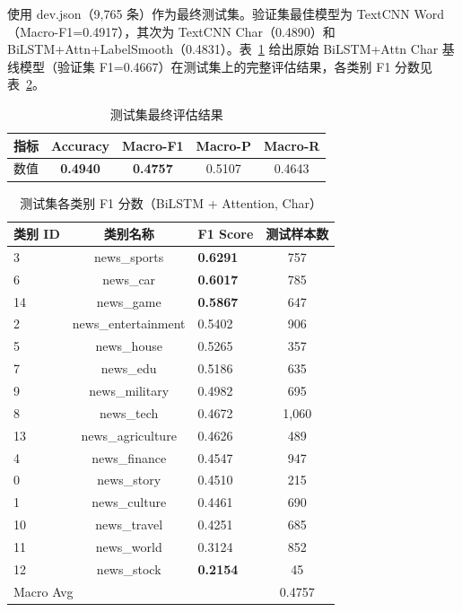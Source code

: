 使用 dev.json（9,765 条）作为最终测试集。验证集最佳模型为 TextCNN Word（Macro-F1=0.4917），其次为 TextCNN Char（0.4890）和 BiLSTM+Attn+LabelSmooth（0.4831）。表~\ref{tab:test} 给出原始 BiLSTM+Attn Char 基线模型（验证集 F1=0.4667）在测试集上的完整评估结果，各类别 F1 分数见表~\ref{tab:perclass}。

\begin{table}[htbp]
\centering
\caption{测试集最终评估结果}
\label{tab:test}
\begin{tabular}{lcccc}
\hline
指标 & Accuracy & Macro-F1 & Macro-P & Macro-R \\
\hline
数值 & \textbf{0.4940} & \textbf{0.4757} & 0.5107 & 0.4643 \\
\hline
\end{tabular}
\end{table}

\begin{table}[htbp]
\centering
\caption{测试集各类别 F1 分数（BiLSTM + Attention, Char）}
\label{tab:perclass}
\begin{tabular}{lclc}
\hline
类别 ID & 类别名称 & F1 Score & 测试样本数 \\
\hline
3  & news\_sports        & \textbf{0.6291} & 757 \\
6  & news\_car           & \textbf{0.6017} & 785 \\
14 & news\_game          & \textbf{0.5867} & 647 \\
2  & news\_entertainment & 0.5402 & 906 \\
5  & news\_house         & 0.5265 & 357 \\
7  & news\_edu           & 0.5186 & 635 \\
9  & news\_military      & 0.4982 & 695 \\
8  & news\_tech          & 0.4672 & 1,060 \\
13 & news\_agriculture   & 0.4626 & 489 \\
4  & news\_finance       & 0.4547 & 947 \\
0  & news\_story         & 0.4510 & 215 \\
1  & news\_culture       & 0.4461 & 690 \\
10 & news\_travel        & 0.4251 & 685 \\
11 & news\_world         & 0.3124 & 852 \\
12 & news\_stock         & \textbf{0.2154} & 45 \\
\hline
\multicolumn{3}{l}{Macro Avg} & 0.4757 & 9,765 \\
\hline
\end{tabular}
\end{table}

